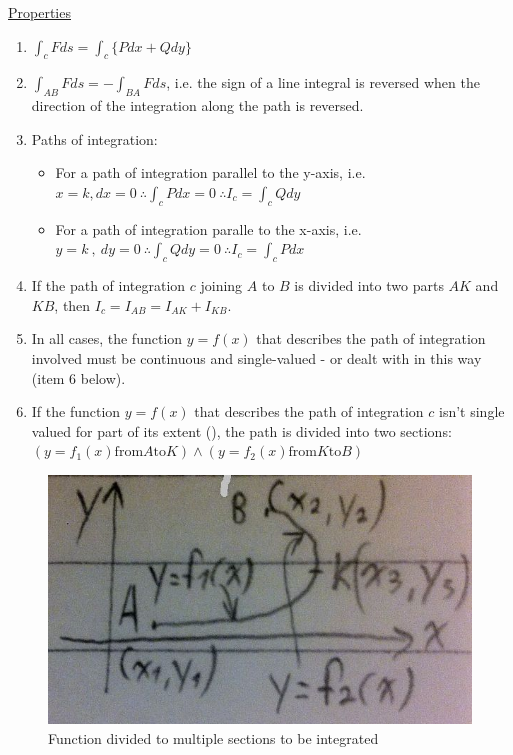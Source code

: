 \documentclass[12pt]{article}
\begin{document}
\begin{flushleft}
	\uline{Properties}  
	\begin{enumerate}
	\item $\displaystyle \int_c Fds = \int_c \{ Pdx + Qdy \}$ 
	\item $\displaystyle \int_{AB} Fds = - \int_{BA} F ds$, i.e. the sign of a line integral is reversed when the direction of the integration along the path is reversed. 
	\item Paths of integration: 
	\begin{itemize} 
		\renewcommand{\labelitemi}{$\rightarrow$}
	\item For a path of integration parallel to the y-axis, i.e. $\displaystyle x=k, dx =0 \ \therefore \int_c Pdx = 0 \ \therefore I_c = \int_c Q dy$ 
	\item For a path of integration paralle to the x-axis, i.e. $\displaystyle y=k \ , \ dy=0 \ \therefore \int_c Qdy = 0 \ \therefore I_c = \int_c Pdx$
	\end{itemize}
	\item If the path of integration $c$ joining $A$ to $B$ is divided into two parts $AK$ and $KB$, then $\displaystyle I_c = I_{AB} = I_{AK} + I_{KB}$. 
	\item In all cases, the function $y=f(x)$ that describes the path of integration involved must be continuous and single-valued - or dealt with in this way (item 6 below). 
	\item If the function $y=f(x)$ that describes the path of integration $c$ isn't single valued for part of its extent (), the path is divided into two sections: \linebreak 
	$\displaystyle (y = f_1(x) \text{from} A \text{to} K ) \land ( y = f_2(x) \text{from} K \text{to} B )$ 
	\end{enumerate} 

	\begin{figure}[H]
	\centering
	\includegraphics[scale=0.4]{intDividedPath}
	\caption{Function divided to multiple sections to be integrated}
	\label{fig:intDividedPath}
	\end{figure}
		

\end{flushleft}
\end{document}
